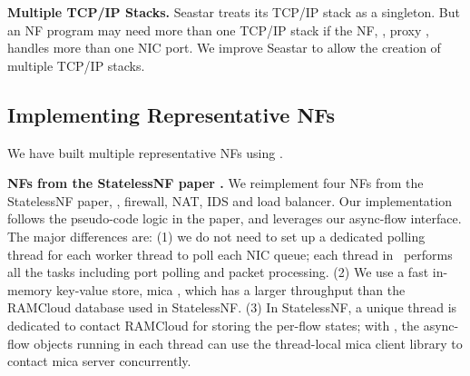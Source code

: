 

\noindent\textbf{Multiple TCP/IP Stacks.} Seastar treats its TCP/IP stack as a singleton. But an NF program may need more than one TCP/IP stack if the NF, \eg, proxy \cite{haproxy}, handles more than one NIC port.
We improve Seastar to allow the creation of multiple TCP/IP stacks.

\subsection{Implementing Representative NFs}
\label{NFs}

We have built multiple representative NFs using \netstar.



\vspace{1mm}
\noindent\textbf{NFs from the StatelessNF paper \cite{201545}.} We reimplement four NFs from the StatelessNF paper, \ie, firewall, NAT, IDS and load balancer. Our implementation follows the pseudo-code logic in the paper, and leverages our async-flow interface. The major differences are: (1) we do not need to set up a dedicated polling thread for each worker thread to poll each NIC queue; each thread in \netstar~performs all the tasks including port polling and packet processing. %
(2) %
We use a fast in-memory key-value store, mica \cite{179747}, which has a larger throughput than the RAMCloud database \cite{ousterhout2015ramcloud} used in StatelessNF. %
(3) In StatelessNF, a unique thread is dedicated to contact RAMCloud for storing the per-flow states; with \netstar, the async-flow objects running in each thread can use the thread-local mica client library to contact mica server concurrently.

